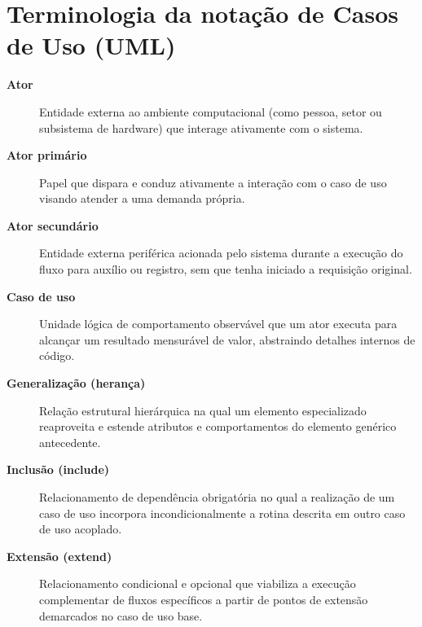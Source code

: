\section*{Terminologia da notação de Casos de Uso (UML)}

\begin{description}
    \item[\textbf{Ator}] Entidade externa ao ambiente computacional (como pessoa, setor ou subsistema de hardware) que interage ativamente com o sistema.
    \item[\textbf{Ator primário}] Papel que dispara e conduz ativamente a interação com o caso de uso visando atender a uma demanda própria.
    \item[\textbf{Ator secundário}] Entidade externa periférica acionada pelo sistema durante a execução do fluxo para auxílio ou registro, sem que tenha iniciado a requisição original.
    \item[\textbf{Caso de uso}] Unidade lógica de comportamento observável que um ator executa para alcançar um resultado mensurável de valor, abstraindo detalhes internos de código.
    \item[\textbf{Generalização (herança)}] Relação estrutural hierárquica na qual um elemento especializado reaproveita e estende atributos e comportamentos do elemento genérico antecedente.
    \item[\textbf{Inclusão (\guillemotleft include\guillemotright)}] Relacionamento de dependência obrigatória no qual a realização de um caso de uso incorpora incondicionalmente a rotina descrita em outro caso de uso acoplado.
    \item[\textbf{Extensão (\guillemotleft extend\guillemotright)}] Relacionamento condicional e opcional que viabiliza a execução complementar de fluxos específicos a partir de pontos de extensão demarcados no caso de uso base.
\end{description}